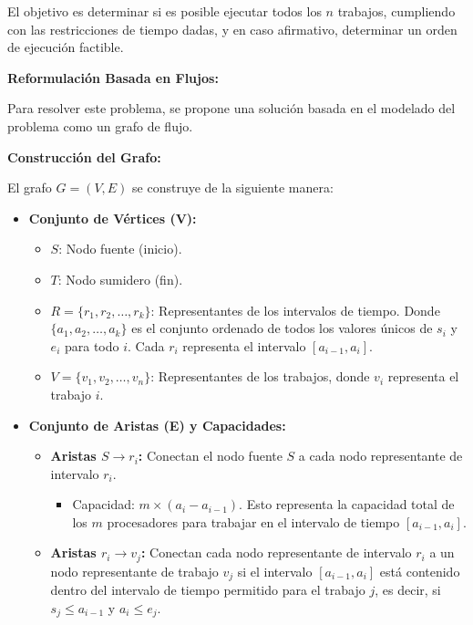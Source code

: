 \documentclass[14pt]{extarticle}
\begin{document}
El objetivo es determinar si es posible ejecutar todos los $n$ trabajos, cumpliendo con las restricciones de tiempo dadas, y en caso afirmativo, determinar un orden de ejecución factible.

\textbf{Reformulación Basada en Flujos:}

Para resolver este problema, se propone una solución basada en el modelado del problema como un grafo de flujo.

\textbf{Construcción del Grafo:}

El grafo $G = (V, E)$ se construye de la siguiente manera:

\begin{itemize}
    \item \textbf{Conjunto de Vértices (V):}
    \begin{itemize}
        \item $S$: Nodo fuente (inicio).
        \item $T$: Nodo sumidero (fin).
        \item $R = \{r_1, r_2, \ldots, r_k\}$: Representantes de los intervalos de tiempo. Donde $\{a_1, a_2, \ldots, a_k\}$ es el conjunto ordenado de todos los valores únicos de $s_i$ y $e_i$ para todo $i$. Cada $r_i$ representa el intervalo $[a_{i-1}, a_i]$.
        \item $V = \{v_1, v_2, \ldots, v_n\}$: Representantes de los trabajos, donde $v_i$ representa el trabajo $i$.
    \end{itemize}
    \item \textbf{Conjunto de Aristas (E) y Capacidades:}
    \begin{itemize}
        \item \textbf{Aristas $S \rightarrow r_i$:} Conectan el nodo fuente $S$ a cada nodo representante de intervalo $r_i$.
            \begin{itemize}
                \item Capacidad: $m \times (a_i - a_{i-1})$. Esto representa la capacidad total de los $m$ procesadores para trabajar en el intervalo de tiempo $[a_{i-1}, a_i]$.
            \end{itemize}
        \item \textbf{Aristas $r_i \rightarrow v_j$:} Conectan cada nodo representante de intervalo $r_i$ a un nodo representante de trabajo $v_j$ si el intervalo $[a_{i-1}, a_i]$ está contenido dentro del intervalo de tiempo permitido para el trabajo $j$, es decir, si $s_j \leq a_{i-1}$ y $a_i \leq e_j$.
            \begin{itemize}

\end{itemize}
\end{itemize}
\end{itemize}
\end{document}
